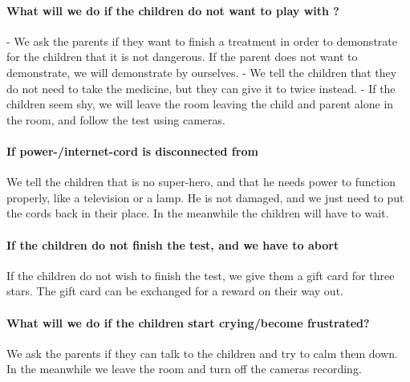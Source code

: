 \paragraph{What will we do if the children do not want to play with \ab{}?}
- We ask the parents if they want to finish a treatment in order to demonstrate for the children that it is not dangerous.
If the parent does not want to demonstrate, we will demonstrate by ourselves. 
- We tell the children that they do not need to take the medicine, but they can give it to \ab{} twice instead.
- If the children seem shy, we will leave the room leaving the child and parent alone in the room, and follow the test using cameras. 
 
\paragraph{If power-/internet-cord is disconnected from \ab{}}
We tell the children that \ab{} is no super-hero, and that he needs power to function properly, like a television or a lamp. He is not damaged, and we just need to put the cords back in their place. In the meanwhile the children will have to wait. 


\paragraph{If the children do not finish the test, and we have to abort}
If the children do not wish to finish the test, we give them a gift card for three stars. The gift card can be exchanged for a reward on their way out. 

\paragraph{What will we do if the children start crying/become frustrated?}
We ask the parents if they can talk to the children and try to calm them down. In the meanwhile we leave the room and turn off the cameras recording. 

  
